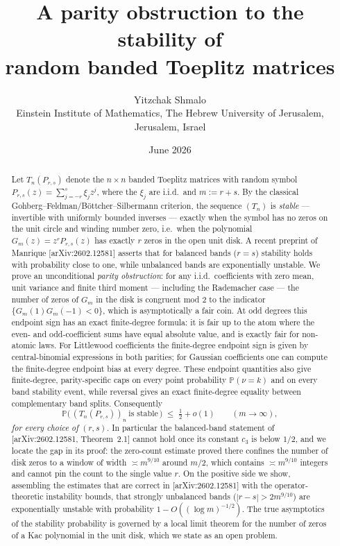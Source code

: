 \documentclass[11pt]{article}
\title{A parity obstruction to the stability of\\random banded Toeplitz matrices}
\author{Yitzchak Shmalo\\
\small Einstein Institute of Mathematics, The Hebrew University of Jerusalem, Jerusalem, Israel\\
\small }
\date{June 2026}
\newcommand{\PP}{\mathbb{P}}
\begin{document}
\maketitle

\begin{abstract}
Let $T_n(P_{r,s})$ denote the $n\times n$ banded Toeplitz matrices with random
symbol $P_{r,s}(z)=\sum_{j=-r}^{s}\xi_jz^{j}$, where the $\xi_j$ are i.i.d.\ and
$m:=r+s$.  By the classical Gohberg--Feldman/B\"ottcher--Silbermann criterion, the
sequence $(T_n)$ is \emph{stable} --- invertible with uniformly bounded inverses
--- exactly when the symbol has no zeros on the unit circle and winding number
zero, i.e.\ when the polynomial $G_m(z)=z^{r}P_{r,s}(z)$ has exactly $r$ zeros in
the open unit disk.  A recent preprint of Manrique
[arXiv:2602.12581] asserts that for balanced bands ($r=s$) stability holds with
probability close to one, while unbalanced bands are exponentially unstable.  We
prove an unconditional \emph{parity obstruction}: for any i.i.d.\ coefficients
with zero mean, unit variance and finite third moment --- including the
Rademacher case --- the number of zeros of $G_m$ in the disk is congruent mod $2$
to the indicator $\{G_m(1)G_m(-1)<0\}$, which is asymptotically a fair coin.
At odd degrees this endpoint sign has an exact finite-degree formula: it is
fair up to the atom where the even- and odd-coefficient sums have equal absolute
value, and is exactly fair for non-atomic laws.  For Littlewood coefficients the
finite-degree endpoint sign is given by central-binomial expressions in both
parities; for Gaussian coefficients one can compute the finite-degree endpoint
bias at every degree.  These endpoint quantities also give finite-degree,
parity-specific caps on every point probability \(\PP(\nu=k)\) and on every
band stability event, while reversal gives an exact finite-degree equality
between complementary band splits.
Consequently
\[
\PP\bigl(\,(T_n(P_{r,s}))_n\ \text{is stable}\,\bigr)\;\le\;\tfrac12+o(1)
\qquad(m\to\infty),
\]
\emph{for every choice of} $(r,s)$.  In particular the balanced-band statement of
[arXiv:2602.12581, Theorem~2.1] cannot hold once its constant $c_3$ is below
$1/2$, and we locate the gap in its proof: the zero-count estimate proved there
confines the number of disk zeros to a window of width $\asymp m^{9/10}$ around
$m/2$, which contains $\asymp m^{9/10}$ integers and cannot pin the count to the
single value $r$.  On the positive side we show, assembling the estimates that
are correct in [arXiv:2602.12581] with the operator-theoretic instability bounds,
that strongly unbalanced bands ($|r-s|>2m^{9/10}$) are exponentially unstable with
probability $1-O((\log m)^{-1/2})$.  The true asymptotics of the stability
probability is governed by a local limit theorem for the number of zeros of a Kac
polynomial in the unit disk, which we state as an open problem.
\end{abstract}
\end{document}
